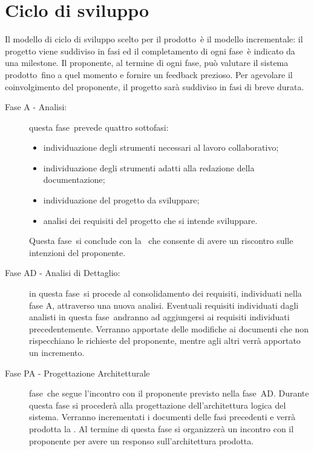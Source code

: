 \documentclass[../PianoProgetto.tex]{subfiles}
\begin{document}
\section{Ciclo di sviluppo}

	Il modello di ciclo di sviluppo scelto per il prodotto\g\ è il modello incrementale\g : il progetto viene suddiviso in fasi ed il completamento di ogni fase\g\ è indicato da una milestone\g .
	Il proponente, al termine di ogni fase\g, può valutare il sistema prodotto\g\ fino a quel momento e fornire un feedback prezioso.
	Per agevolare il coinvolgimento del proponente, il progetto sarà suddiviso in fasi di breve durata.
	\begin{description}
	
	\item[Fase A - Analisi:] questa fase\g\ prevede quattro sottofasi:
		\begin{itemize}
		\item individuazione degli strumenti necessari al lavoro collaborativo;
		\item individuazione degli strumenti adatti alla redazione della documentazione;
		\item individuazione del progetto da sviluppare;
		\item analisi dei requisiti del progetto che si intende sviluppare.
		\end{itemize}
		Questa fase\g\ si conclude con la \revisionedeirequisiti\ che consente di avere un riscontro sulle intenzioni del proponente.


	\item[Fase AD - Analisi di Dettaglio:]
	in questa fase\g\ si procede al consolidamento dei requisiti, individuati nella fase A, attraverso una nuova analisi.
	Eventuali requisiti individuati dagli analisti in questa fase\g\ andranno ad aggiungersi ai requisiti individuati precedentemente. 
	Verranno apportate delle modifiche ai documenti che non rispecchiano le richieste del proponente, mentre agli altri verrà apportato un incremento.

	\item[Fase PA - Progettazione Architetturale]
		fase\g\ che segue l'incontro con il proponente previsto nella fase\g\ AD. Durante questa fase si procederà alla progettazione dell'architettura logica del sistema. Verranno incrementati i documenti delle fasi precedenti e verrà prodotta la \specificatecnica . Al termine di questa fase si organizzerà un incontro con il proponente per avere un responso sull'architettura prodotta.


\end{description}
\end{document}
